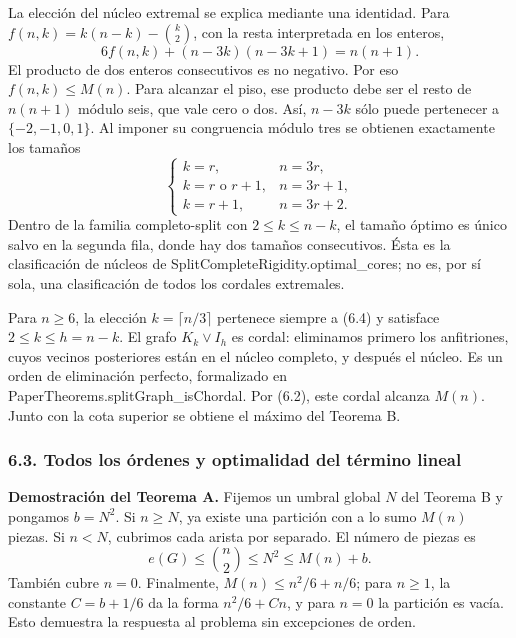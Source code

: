 \documentclass[spanish,11pt,a4paper]{article}
\begin{document}
La elección del núcleo extremal se explica mediante una identidad. Para \(f(n,k)=k(n-k)-\binom k2\), con la resta interpretada en los enteros, \[
6f(n,k)+(n-3k)(n-3k+1)=n(n+1).
\tag{6.3}
\] El producto de dos enteros consecutivos es no negativo. Por eso \(f(n,k)\le M(n)\). Para alcanzar el piso, ese producto debe ser el resto de \(n(n+1)\) módulo seis, que vale cero o dos. Así, \(n-3k\) sólo puede pertenecer a \(\{-2,-1,0,1\}\). Al imponer su congruencia módulo tres se obtienen exactamente los tamaños \[
\begin{cases}
k=r,& n=3r,\\
k=r\text{ o }r+1,& n=3r+1,\\
k=r+1,& n=3r+2.
\end{cases}
\tag{6.4}
\] Dentro de la familia completo-split con \(2\le k\le n-k\), el tamaño óptimo es único salvo en la segunda fila, donde hay dos tamaños consecutivos. Ésta es la clasificación de núcleos de {\ttfamily\small SplitComplet\discretionary{\hbox{\ensuremath{\hookrightarrow}}}{}{}eRigidity.\discretionary{\hbox{\ensuremath{\hookrightarrow}}}{}{}optimal\_\discretionary{\hbox{\ensuremath{\hookrightarrow}}}{}{}cores}; no es, por sí sola, una clasificación de todos los cordales extremales.

Para \(n\ge6\), la elección \(k=\lceil n/3\rceil\) pertenece siempre a (6.4) y satisface \(2\le k\le h=n-k\). El grafo \(K_k\vee I_h\) es cordal: eliminamos primero los anfitriones, cuyos vecinos posteriores están en el núcleo completo, y después el núcleo. Es un orden de eliminación perfecto, formalizado en {\ttfamily\small PaperTheorem\discretionary{\hbox{\ensuremath{\hookrightarrow}}}{}{}s.\discretionary{\hbox{\ensuremath{\hookrightarrow}}}{}{}splitGraph\_\discretionary{\hbox{\ensuremath{\hookrightarrow}}}{}{}isChordal}. Por (6.2), este cordal alcanza \(M(n)\). Junto con la cota superior se obtiene el máximo del Teorema B.

\subsubsection{6.3. Todos los órdenes y optimalidad del término lineal}\label{todos-los-ordenes-y-optimalidad-del-termino-lineal}

\textbf{Demostración del Teorema A.} Fijemos un umbral global \(N\) del Teorema B y pongamos \(b=N^2\). Si \(n\ge N\), ya existe una partición con a lo sumo \(M(n)\) piezas. Si \(n<N\), cubrimos cada arista por separado. El número de piezas es \[
e(G)\le\binom n2\le N^2\le M(n)+b.
\] También cubre \(n=0\). Finalmente, \(M(n)\le n^2/6+n/6\); para \(n\ge1\), la constante \(C=b+1/6\) da la forma \(n^2/6+Cn\), y para \(n=0\) la partición es vacía. Esto demuestra la respuesta al problema sin excepciones de orden.
\end{document}
